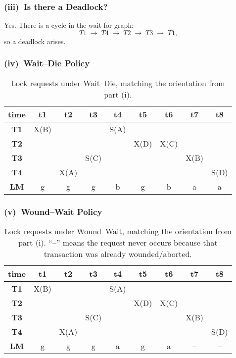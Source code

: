 \documentclass[11pt]{article}
\begin{document}
\subsubsection*{(iii)~Is there a Deadlock?}
Yes. There is a cycle in the wait-for graph:
\[
T1 \;\rightarrow\; T4 \;\rightarrow\; T2 \;\rightarrow\; T3 \;\rightarrow\; T1,
\]
so a deadlock arises.

\subsubsection*{(iv)~Wait--Die Policy}
\begin{table}[!htbp]
\centering
\begin{tabular}{c|cccccccc}
\textbf{time}
  & \textbf{t1} 
  & \textbf{t2} 
  & \textbf{t3} 
  & \textbf{t4} 
  & \textbf{t5} 
  & \textbf{t6} 
  & \textbf{t7}
  & \textbf{t8} \\
\hline
\textbf{T1}
  & X(B) &      &      & S(A) &      &      &      &      \\
\textbf{T2}
  &      &      &      &      & X(D) & X(C) &      &      \\
\textbf{T3}
  &      &      & S(C) &      &      &      & X(B) &      \\
\textbf{T4}
  &      & X(A) &      &      &      &      &      & S(D) \\
\hline
\textbf{LM}
  & g    & g    & g    & b    & g    & b    & a    & a    \\
\end{tabular}
\caption{Lock requests under Wait--Die, matching the orientation from part (i).}
\end{table}

\newpage
\subsubsection*{(v)~Wound--Wait Policy}
\begin{table}[!htbp]
\centering
\begin{tabular}{c|cccccccc}
\textbf{time}
  & \textbf{t1} 
  & \textbf{t2} 
  & \textbf{t3} 
  & \textbf{t4} 
  & \textbf{t5} 
  & \textbf{t6} 
  & \textbf{t7}
  & \textbf{t8} \\
\hline
\textbf{T1}
  & X(B) &      &      & S(A) &      &      &      &      \\
\textbf{T2}
  &      &      &      &      & X(D) & X(C) &      &      \\
\textbf{T3}
  &      &      & S(C) &      &      &      & X(B) &      \\
\textbf{T4}
  &      & X(A) &      &      &      &      &      & S(D) \\
\hline
\textbf{LM}
  & g    & g    & g    & a    & g    & a    & --   & --   \\
\end{tabular}
\caption{Lock requests under Wound--Wait, matching the orientation from part (i). 
``--'' means the request never occurs because that transaction was already wounded/aborted.}
\end{table}

\end{document}
